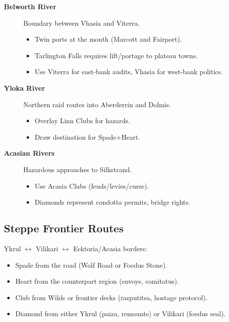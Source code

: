 \begin{description}
\item[\textbf{Belworth River}] Boundary between Vhasia and Viterra.
\begin{itemize}
\item Twin ports at the mouth (Marcott and Fairport).
\item Tarlington Falls requires lift/portage to plateau towns.
\item Use Viterra for east-bank audits, Vhasia for west-bank politics.
\end{itemize}

\item[\textbf{Yloka River}] Northern raid routes into Aberderrin and Dolmis.
\begin{itemize}
\item Overlay Linn Clubs for hazards.
\item Draw destination for Spade+Heart.
\end{itemize}

\item[\textbf{Acasian Rivers}] Hazardous approaches to Silkstrand.
\begin{itemize}
\item Use Acasia Clubs (feuds/levies/curse).
\item Diamonds represent condotta permits, bridge rights.
\end{itemize}
\end{description}

\subsection{Steppe Frontier Routes}
\label{subsec:steppe-frontiers}

Ykrul $\leftrightarrow$ Vilikari $\leftrightarrow$ Ecktoria/Acasia borders:
\begin{itemize}
\item Spade from the road (Wolf Road or Foedus Stone).
\item Heart from the counterpart region (envoys, comitatus).
\item Club from Wilds or frontier decks (rasputitsa, hostage protocol).
\item Diamond from either Ykrul (paiza, remounts) or Vilikari (foedus seal).
\end{itemize}

